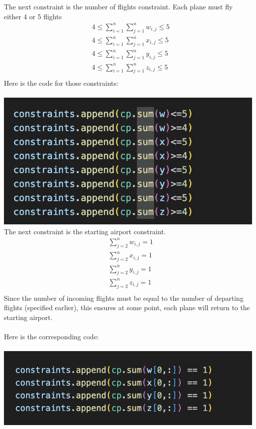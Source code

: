 \documentclass[12pt]{extarticle}
\begin{document}
The next constraint is the number of flights constraint. Each plane must fly either 4 or 5 flights
\begin{align*}
&4 \leq\sum_{i=1}^n\sum_{j=1}^nw_{i,j} \leq 5 \\
&4 \leq\sum_{i=1}^n\sum_{j=1}^nx_{i,j} \leq 5 \\
&4 \leq\sum_{i=1}^n\sum_{j=1}^ny_{i,j} \leq 5 \\
&4 \leq\sum_{i=1}^n\sum_{j=1}^nz_{i,j} \leq 5 \\
\end{align*}
Here is the code for those constraints: \\ \\
\includegraphics[scale = .5]{images/constraints4.png} \\

The next constraint is the starting airport constraint.
\begin{align*}
&\sum_{j=2}^nw_{i,j} = 1 \\
&\sum_{j=2}^nx_{i,j} = 1 \\
&\sum_{j=2}^ny_{i,j} = 1 \\
&\sum_{j=2}^nz_{i,j} = 1 \\
\end{align*}
Since the number of incoming flights must be equal to the number of departing flights (specified earlier), this ensures at some point, each plane will return to the starting airport. \\ \\
Here is the corresponding code:\\ \\
\includegraphics[scale = .5]{images/constraints5.png} \\
\end{document}
